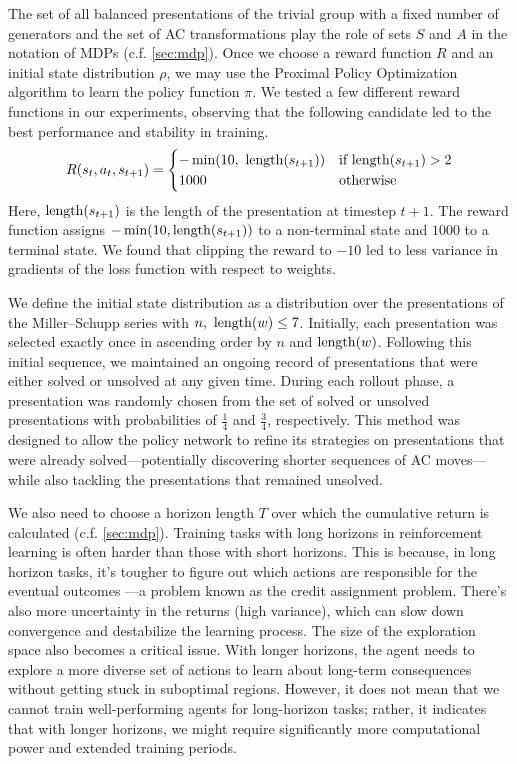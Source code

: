 The set of all balanced presentations of the trivial group with a fixed number of generators and the set of AC transformations play the role of sets $S$ and $A$ in the notation of MDPs (c.f. \autoref{sec:mdp}). Once we choose a reward function $R$ and an initial state distribution $\rho$, we may use the Proximal Policy Optimization algorithm to learn the policy function $\pi$. We tested a few different reward functions in our experiments, observing that the following candidate led to the best performance and stability in training.
\[
R(s_{t}, a_{t}, s_{t+1}) =
\begin{cases}
-\min(10, \ \operatorname{length}(s_{t+1})) & \text{if length}(s_{t+1}) > 2 \\
1000 & \text{otherwise }
\end{cases}
\]
Here, $\operatorname{length}(s_{t+1})$ is the length of the presentation at timestep $t+1$. The reward function assigns $-\min(10, \operatorname{length}(s_{t+1}))$ to a non-terminal state and $1000$ to a terminal state. We found that clipping the reward to $-10$ led to less variance in gradients of the loss function with respect to weights.
\newline

We define the initial state distribution as a distribution over the presentations of the Miller--Schupp series with $n, \ \operatorname{length}(w) \leq 7$. Initially, each presentation was selected exactly once in ascending order by $n$ and $\operatorname{length}(w)$. Following this initial sequence, we maintained an ongoing record of presentations that were either solved or unsolved at any given time. During each rollout phase, a presentation was randomly chosen from the set of solved or unsolved presentations with probabilities of  $\frac{1}{4}$ and $\frac{3}{4}$, respectively. This method was designed to allow the policy network to refine its strategies on presentations that were already solved—potentially discovering shorter sequences of AC moves—while also tackling the presentations that remained unsolved.
\newline

We also need to choose a horizon length $T$ over which the cumulative return is calculated (c.f. \autoref{sec:mdp}). Training tasks with long horizons in reinforcement learning is often harder than those with short horizons. This is because, in long horizon tasks, it's tougher to figure out which actions are responsible for the eventual outcomes —a problem known as the credit assignment problem. There's also more uncertainty in the returns (high variance), which can slow down convergence and destabilize the learning process. The size of the exploration space also becomes a critical issue. With longer horizons, the agent needs to explore a more diverse set of actions to learn about long-term consequences without getting stuck in suboptimal regions. However, it does not mean that we cannot train well-performing agents for long-horizon tasks; rather, it indicates that with longer horizons, we might require significantly more computational power and extended training periods.
\newline

